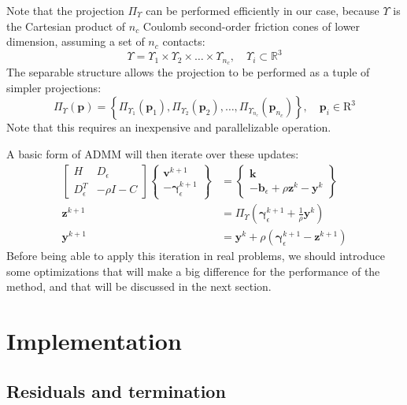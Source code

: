 \documentclass[final,3p]{elsarticle}
\newcommand{\vect}[1]{\bm{#1}}
\begin{document}
Note that the projection $\Pi_\Upsilon$ can be performed efficiently in our case, because $\Upsilon$ is the Cartesian product of $n_c$ Coulomb second-order friction cones of lower dimension, assuming a set of $n_c$ contacts:
\[
\Upsilon = \Upsilon_1 \times \Upsilon_2 \times \ldots \times \Upsilon_{n_c}, \quad \Upsilon_i \subset \mathbb{R}^3
\]
The separable structure allows the projection to be performed as a tuple of simpler projections:
\[
\Pi_\Upsilon(\vect{p}) = \left\{ \Pi_{\Upsilon_1}(\vect{p}_1), \Pi_{\Upsilon_2}(\vect{p}_2), \ldots,  \Pi_{\Upsilon_{n_c}}(\vect{p}_{n_c}) \right\}, \quad \vect{p}_i \in \mathrm{R}^3
\]
%
Note that this requires an inexpensive and parallelizable operation.

A basic form of ADMM will then iterate over these updates:
\begin{align}
    \begin{bmatrix}
		 H   & D_\epsilon \\
		 D_\epsilon^T & - \rho I - C
		\end{bmatrix}
		\begin{Bmatrix}
		 \vect{v}^{k+1}   \\
		 -\vect{\gamma}_\epsilon^{k+1} 
		\end{Bmatrix}
		&=
		\begin{Bmatrix}
		 \vect{k} \\
		 -\vect{b}_\epsilon + \rho \vect{z}^k -\vect{y}^k 
		\end{Bmatrix} \label{eq:admm_step1} \\
		\vect{z}^{k+1} &= \Pi_\Upsilon \left(  \vect{\gamma}_\epsilon^{k+1} +\frac{1}{\rho} \vect{y}^k \right ) \label{eq:admm_step2} \\
		\vect{y}^{k+1} &= \vect{y}^k + \rho \left( \vect{\gamma}_\epsilon^{k+1} - \vect{z}^{k+1} \right) \label{eq:admm_step3}
\end{align}
%
Before being able to apply this iteration in real problems, we should introduce some optimizations that will make a big difference for the performance of the method, and that will be discussed in the next section.


\section{Implementation}


\subsection{Residuals and termination}
\end{document}
